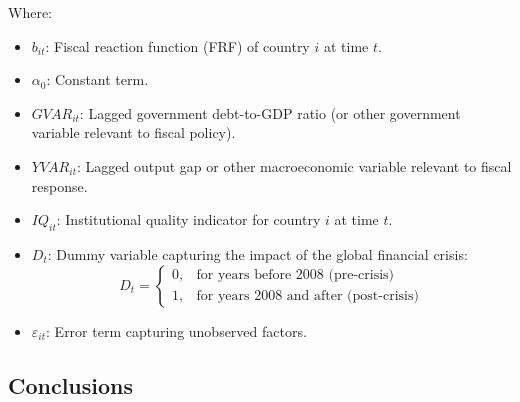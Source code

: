 \documentclass[10pt, oneside]{article}
\begin{document}
Where:

\begin{itemize}
	\item $b_{it}$: Fiscal reaction function (FRF) of country $i$ at time $t$.
	\item $\alpha_0$: Constant term.
	\item $GVAR_{it}$: Lagged government debt-to-GDP ratio (or other government variable relevant to fiscal policy).
	\item $YVAR_{it}$: Lagged output gap or other macroeconomic variable relevant to fiscal response.
	\item $IQ_{it}$: Institutional quality indicator for country $i$ at time $t$.
	\item $D_t$: Dummy variable capturing the impact of the global financial crisis:
	      \begin{equation*}
		      D_t =
		      \begin{cases}
			      0, & \text{for years before 2008 (pre-crisis)}     \\
			      1, & \text{for years 2008 and after (post-crisis)}
		      \end{cases}
	      \end{equation*}
	\item $\varepsilon_{it}$: Error term capturing unobserved factors.
\end{itemize}

\subsection{Conclusions}
\end{document}
